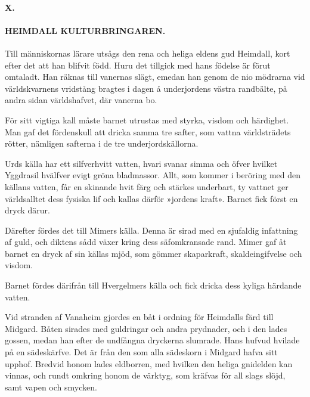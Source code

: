 \paragraph{X.}

\paragraph{HEIMDALL KULTURBRINGAREN.}

Till människornas lärare utsågs den rena och heliga eldens gud Heimdall,
kort efter det att han blifvit född. Huru det tillgick med hans födelse
är förut omtaladt. Han räknas till vanernas slägt, emedan han genom de
nio mödrarna vid världskvarnens vridstång bragtes i dagen å underjordens
västra randbälte, på andra sidan världshafvet, där vanerna bo.

För sitt vigtiga kall måste barnet utrustas med styrka, visdom och
härdighet. Man gaf det fördenskull att dricka samma tre safter, som
vattna världsträdets rötter, nämligen safterna i de tre
underjordskällorna.

Urds källa har ett silfverhvitt vatten, hvari svanar simma och öfver
hvilket Yggdrasil hvälfver evigt gröna bladmassor. Allt, som kommer i
beröring med den källans vatten, får en skinande hvit färg och stärkes
underbart, ty vattnet ger världsalltet dess fysiska lif och kallas
därför »jordens kraft». Barnet fick först en dryck därur.

\protect\hypertarget{lb1625905.xhtmlux5cux23start21}{}{}\protect\hypertarget{lb1625905.xhtmlux5cux23start21-a}{}{}\protect\hypertarget{lb1625905.xhtmlux5cux23start21-b}{}{}\protect\hypertarget{lb1625905.xhtmlux5cux23start21-c}{}{}\protect\hypertarget{lb1625905.xhtmlux5cux23start21-d}{}{}

Därefter fördes det till Mimers källa. Denna är sirad med en sjufaldig
infattning af guld, och diktens sådd växer kring dess säfomkransade
rand. Mimer gaf åt barnet en dryck af sin källas mjöd, som gömmer
skaparkraft, skaldeingifvelse och visdom.

Barnet fördes därifrån till Hvergelmers källa och fick dricka dess
kyliga härdande vatten.

Vid stranden af Vanaheim gjordes en båt i ordning för Heimdalls färd
till Midgard. Båten sirades med guldringar och andra prydnader, och i
den lades gossen, medan han efter de undfångna dryckerna slumrade. Hans
hufvud hvilade på en sädeskärfve. Det är från den som alla sädeskorn i
Midgard hafva sitt upphof. Bredvid honom lades eldborren, med hvilken
den heliga gnidelden kan vinnas, och rundt omkring honom de värktyg, som
kräfvas för all slags slöjd, samt vapen och smycken.

